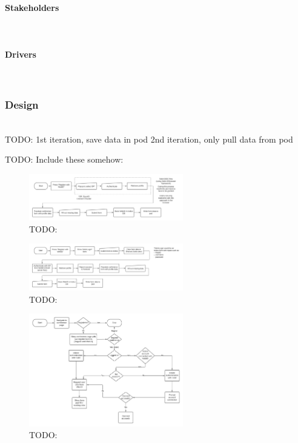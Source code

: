 \paragraph{Stakeholders}\mbox{}\\
\paragraph{Drivers}\mbox{}\\

\subsubsection{Design}\mbox{}\\

TODO:
1st iteration, save data in pod
2nd iteration, only pull data from pod

TODO: Include these somehow:

\begin{figure}
    \centering
    \includegraphics[width=0.6\textwidth]{prototype/graphs/poc-conference_registration_flow-client_side-sideways.jpeg}
    \caption{TODO:}
    \label{fig:poc-conference_registration_flow-client_side-sideways}
\end{figure}

\begin{figure}
    \centering
    \includegraphics[width=0.6\textwidth]{prototype/graphs/poc-conference_registration_flow-server_side-sideways.jpeg}
    \caption{TODO:}
    \label{fig:poc-conference_registration_flow-server_side-sideways}
\end{figure}

\begin{figure}
    \centering
    \includegraphics[width=0.6\textwidth]{prototype/graphs/poc-conference_registration_flow-sideways.jpeg}
    \caption{TODO:}
    \label{fig:poc-conference_registration_flow-sideways}
\end{figure}

